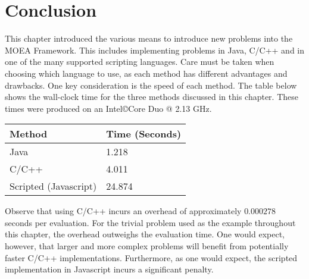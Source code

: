 \section{Conclusion}
This chapter introduced the various means to introduce new problems into the MOEA Framework.  This includes implementing problems in Java, C/C++ and in one of the many supported scripting languages.  Care must be taken when choosing which language to use, as each method has different advantages and drawbacks.  One key consideration is the speed of each method.  The table below shows the wall-clock time for the three methods discussed in this chapter.  These times were produced on an Intel\copyright Core Duo @ 2.13 GHz.

\par
\begin{center}
\begin{tabular}{ll}
  Method & Time (Seconds) \\
  \hline
  Java & 1.218 \\
  C/C++ & 4.011 \\
  Scripted (Javascript) & 24.874
\end{tabular}
\end{center}

Observe that using C/C++ incurs an overhead of approximately $0.000278$ seconds per evaluation.  For the trivial problem used as the example throughout this chapter, the overhead outweighs the evaluation time.  One would expect, however, that larger and more complex problems will benefit from potentially faster C/C++ implementations.  Furthermore, as one would expect, the scripted implementation in Javascript incurs a significant penalty.

